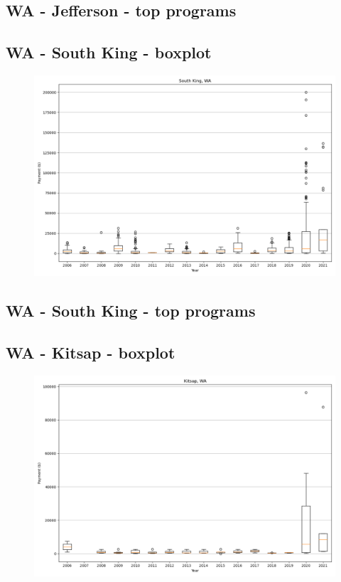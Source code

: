 \subsection*{WA - Jefferson - top programs}

\newpage
\subsection*{WA - South King - boxplot}
\begin{figure}[h]
\centering
\includegraphics[width=7in]{../output/boxplots/counties/South King-WA_boxplot.png}
\end{figure}


\subsection*{WA - South King - top programs}

\newpage
\subsection*{WA - Kitsap - boxplot}
\begin{figure}[h]
\centering
\includegraphics[width=7in]{../output/boxplots/counties/Kitsap-WA_boxplot.png}
\end{figure}


